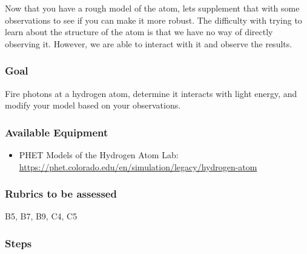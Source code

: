 Now that you have a rough model of the atom, lets supplement that with some observations to see if you can make it more robust. The difficulty with trying to learn about the structure of the atom is that we have no way of directly observing it. However, we are able to interact with it and observe the results.

\subsubsection{Goal}
Fire photons at a hydrogen atom, determine it interacts with light energy, and modify your model based on your observations.

\subsubsection{Available Equipment}

\begin{itemize}
	\item PHET Models of the Hydrogen Atom Lab: \url{https://phet.colorado.edu/en/simulation/legacy/hydrogen-atom}
\end{itemize}

\subsubsection{Rubrics to be assessed}

B5, B7, B9, C4, C5

\subsubsection{Steps}

